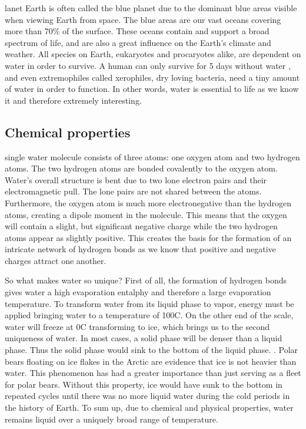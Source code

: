 lanet Earth is often called the blue planet due to the dominant blue areas visible when viewing Earth from space.
The blue areas are our vast oceans covering more than 70\% \cite{WikiEarth} of the surface.
These oceans contain and support a broad spectrum of life, and are also a great influence on the Earth's climate and weather.
All species on Earth, eukaryotes and procaryotes alike, are dependent on water in order to survive.
A human can only survive for 5 days without water \cite{SurviveWater}, and even extremophiles called xerophiles, dry loving bacteria, need a tiny amount of water in order to function.
In other words, water is essential to life as we know it and therefore extremely interesting. 

\subsection{Chemical properties}
 single water molecule consists of three atoms: one oxygen atom and two hydrogen atoms.
The two hydrogen atoms are bonded covalently to the oxygen atom.
Water's overall structure is bent due to two lone electron pairs and their electromagnetic pull.
The lone pairs are not shared between the atoms.
Furthermore, the oxygen atom is much more electronegative than the hydrogen atoms, creating a dipole moment in the molecule.
This means that the oxygen will contain a slight, but significant negative charge while the two hydrogen atoms appear as slightly positive.
This creates the basis for the formation of an intricate network of hydrogen bonds as we know that positive and negative charges attract one another.

So what makes water so unique?
First of all, the formation of hydrogen bonds gives water a high evaporation entalphy and therefore a large evaporation temperature.
To transform water from its liquid phase to vapor, energy must be applied bringing water to a temperature of 100\degree C.
On the other end of the scale, water will freeze at 0\degree C transforming to ice, which brings us to the second uniqueness of water.
In most cases, a solid phase will be denser than a liquid phase.
Thus the solid phase would sink to the bottom of the liquid phase. \cite{SolidWater}.
Polar bears floating on ice flakes in the Arctic are evidence that ice is not heavier than water.
This phenomenon has had a greater importance than just serving as a fleet for polar bears.
Without this property, ice would have sunk to the bottom in repeated cycles until there was no more liquid water during the cold periods in the history of Earth.
To sum up, due to chemical and physical properties, water remains liquid over a uniquely broad range of temperature.

